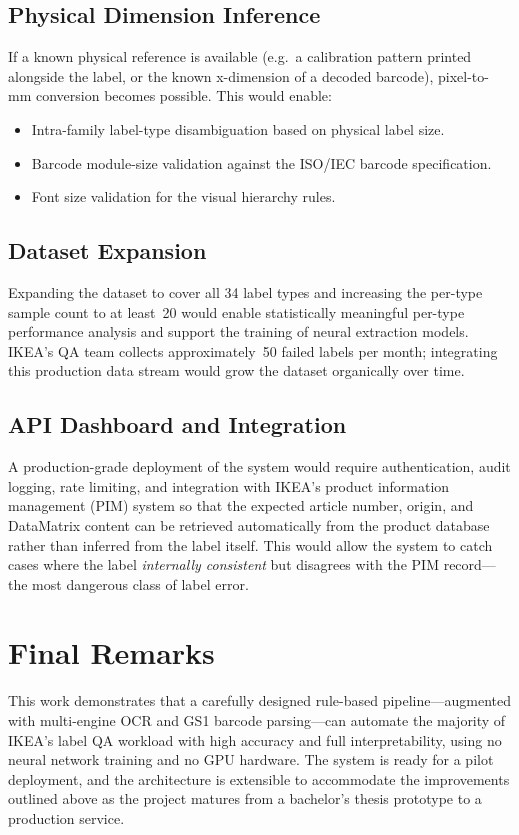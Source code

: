 \subsection{Physical Dimension Inference}

If a known physical reference is available (e.g.\ a calibration pattern printed alongside
the label, or the known x-dimension of a decoded barcode), pixel-to-mm conversion becomes
possible. This would enable:
\begin{itemize}
  \item Intra-family label-type disambiguation based on physical label size.
  \item Barcode module-size validation against the ISO/IEC barcode specification.
  \item Font size validation for the visual hierarchy rules.
\end{itemize}

\subsection{Dataset Expansion}

Expanding the dataset to cover all 34 label types and increasing the per-type sample
count to at least~20 would enable statistically meaningful per-type performance analysis
and support the training of neural extraction models. IKEA's \ac{QA} team collects
approximately~50 failed labels per month; integrating this production data stream would
grow the dataset organically over time.

\subsection{API Dashboard and Integration}

A production-grade deployment of the system would require authentication, audit logging,
rate limiting, and integration with IKEA's product information management (\ac{PIM})
system so that the expected article number, origin, and DataMatrix content can be retrieved
automatically from the product database rather than inferred from the label itself. This
would allow the system to catch cases where the label \emph{internally consistent} but
disagrees with the \ac{PIM} record—the most dangerous class of label error.

\section{Final Remarks}

This work demonstrates that a carefully designed rule-based pipeline—augmented with
multi-engine \ac{OCR} and GS1 barcode parsing—can automate the majority of IKEA's
label \ac{QA} workload with high accuracy and full interpretability, using no neural
network training and no GPU hardware. The system is ready for a pilot deployment, and the
architecture is extensible to accommodate the improvements outlined above as the project
matures from a bachelor's thesis prototype to a production service.
